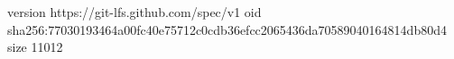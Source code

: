 version https://git-lfs.github.com/spec/v1
oid sha256:77030193464a00fc40e75712c0cdb36efcc2065436da70589040164814db80d4
size 11012
